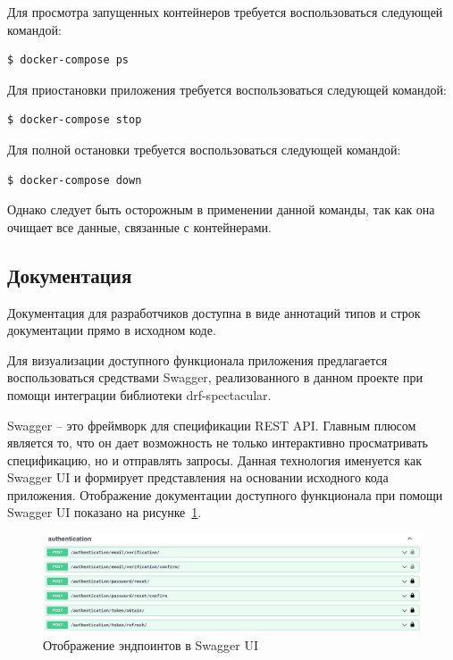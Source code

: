 Для просмотра запущенных контейнеров требуется воспользоваться следующей командой:
\begin{lstlisting}[basicstyle=\ttfamily\small]
$ docker-compose ps
\end{lstlisting}

Для приостановки приложения требуется воспользоваться следующей командой:
\begin{lstlisting}[basicstyle=\ttfamily\small]
$ docker-compose stop
\end{lstlisting}

Для полной остановки требуется воспользоваться следующей командой:
\begin{lstlisting}[basicstyle=\ttfamily\small]
$ docker-compose down
\end{lstlisting}
Однако следует быть осторожным в применении данной команды, так как она очищает все данные, связанные с контейнерами.

\subsection{Документация}\label{subsec:manual:docs}

Документация для разработчиков доступна в виде аннотаций типов и строк документации прямо в исходном коде.

Для визуализации доступного функционала приложения предлагается воспользоваться средствами Swagger,
реализованного в данном проекте при помощи интеграции библиотеки drf-spectacular.

Swagger -- это фреймворк для спецификации REST API.
Главным плюсом является то, что он дает возможность не только интерактивно просматривать спецификацию, но и отправлять запросы.
Данная технология именуется как Swagger UI и формирует представления на основании исходного кода приложения.
Отображение документации доступного функционала при помощи Swagger UI показано на рисунке~\ref{fig:manual:swagger1}.

\begin{figure}[ht]
    \centering
    \includegraphics[width=.9\linewidth]{images/swagger1}
    \caption{Отображение эндпоинтов в Swagger UI}
    \label{fig:manual:swagger1}
\end{figure}


